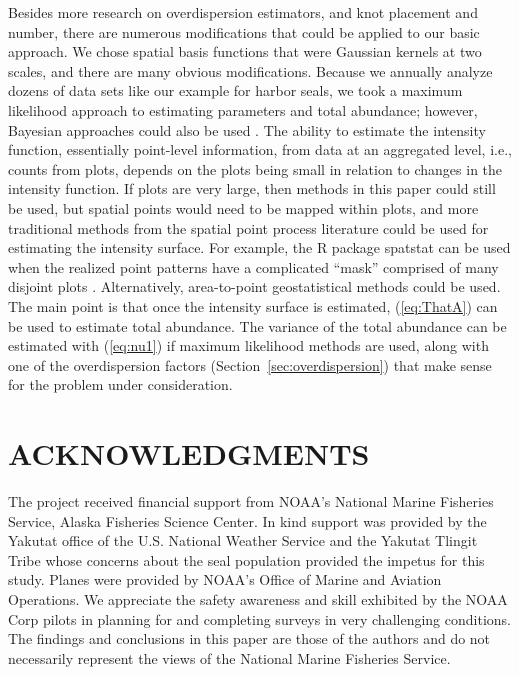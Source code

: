 \documentclass[12pt, titlepage]{article}\usepackage[]{graphicx}\usepackage[]{color}
\begin{document}
Besides more research on overdispersion estimators, and knot placement and number, there are numerous modifications that could be applied to our basic approach. We chose spatial basis functions that were Gaussian kernels at two scales, and there are many obvious modifications.  Because we annually analyze dozens of data sets like our example for harbor seals, we took a maximum likelihood approach to estimating parameters and total abundance; however, Bayesian approaches could also be used \citep{Wikl:spat:2002, Chri:Waag:baye:2002}.  The ability to estimate the intensity function, essentially point-level information, from data at an aggregated level, i.e., counts from plots, depends on the plots being small in relation to changes in the intensity function. If plots are very large, then methods in this paper could still be used, but spatial points would need to be mapped within plots, and more traditional methods from the spatial point process literature could be used for estimating the intensity surface. For example, the R \citep{R:Deve:Core:ALan:2014} package spatstat \citep{Badd:Turn:spat:2005} can be used when the realized point patterns have a complicated ``mask'' comprised of many disjoint plots \citep{Badd:Turn:mode:2006}. Alternatively, area-to-point geostatistical methods \citep{Kyri:geos:2004} could be used. The main point is that once the intensity surface is estimated, (\ref{eq:ThatA}) can be used to estimate total abundance.  The variance of the total abundance can be estimated with (\ref{eq:nu1}) if maximum likelihood methods are used, along with one of the overdispersion factors (Section~\ref{sec:overdispersion}) that make sense for the problem under consideration.

 
\section*{ACKNOWLEDGMENTS} 

The project received financial support from NOAA’s National Marine Fisheries Service, Alaska Fisheries Science Center. In kind support was provided by the Yakutat office of the U.S. National Weather Service and the Yakutat Tlingit Tribe whose concerns about the seal population provided the impetus for this study.  Planes were provided by NOAA's Office of Marine and Aviation Operations.  We appreciate the safety awareness and skill exhibited by the NOAA Corp pilots in planning for and completing surveys in very challenging conditions.  The findings and conclusions in this paper are those of the authors and do not necessarily represent the views of the National Marine Fisheries Service.
\end{document}
